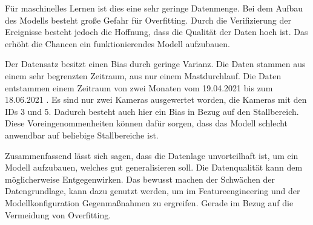 Für maschinelles Lernen ist dies eine sehr geringe Datenmenge. Bei dem Aufbau des Modells besteht große Gefahr für Overfitting. Durch die Verifizierung der Ereignisse besteht jedoch die Hoffnung, dass die Qualität der Daten hoch ist. Das erhöht die Chancen ein funktionierendes Modell aufzubauen. \par

Der Datensatz besitzt einen Bias durch geringe Varianz. Die Daten stammen aus einem sehr begrenzten Zeitraum, aus nur einem Mastdurchlauf. Die Daten entstammen einem Zeitraum von zwei Monaten vom 19.04.2021 bis zum 18.06.2021 . Es sind nur zwei Kameras ausgewertet worden, die Kameras mit den IDs 3 und 5. Dadurch besteht auch hier ein Bias in Bezug auf den Stallbereich. Diese Voreingenommenheiten können dafür sorgen, dass das Modell schlecht anwendbar auf beliebige Stallbereiche ist. \par

Zusammenfassend lässt sich sagen, dass die Datenlage unvorteilhaft ist, um ein Modell aufzubauen, welches gut generalisieren soll. Die Datenqualität kann dem möglicherweise Entgegenwirken. Das bewusst machen der Schwächen der Datengrundlage, kann dazu genutzt werden, um im Featureengineering und der Modellkonfiguration Gegenmaßnahmen zu ergreifen. Gerade im Bezug auf die Vermeidung von Overfitting.